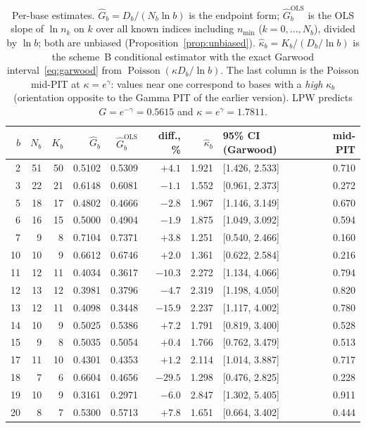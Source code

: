 \documentclass[11pt,a4paper]{article}
\theoremstyle{plain}
\theoremstyle{remark}
\newcommand{\eg}{e^{\gamma}}
\newcommand{\emg}{e^{-\gamma}}
\DeclareMathOperator{\Pois}{Poisson}
\begin{document}
\begin{table}[t]
\centering
\caption{Per-base estimates. $\hat G_b=D_b/(N_b\ln b)$ is the endpoint form;
$\hat G_b^{\mathrm{OLS}}$ is the OLS slope of $\ln n_k$ on $k$ over all known
indices including $n_{\min}$ ($k=0,\dots,N_b$), divided by $\ln b$;
both are unbiased (Proposition~\ref{prop:unbiased}).
$\hat\kappa_b=K_b/(D_b/\ln b)$ is the scheme~B conditional estimator with the
exact Garwood interval~\eqref{eq:garwood} from $\Pois(\kappa D_b/\ln b)$. The last
column is the Poisson mid-PIT at $\kappa=\eg$: values near one correspond to bases
with a \emph{high} $\kappa_b$ (orientation opposite to the Gamma PIT of the earlier
version). LPW predicts $G=\emg=0.5615$ and $\kappa=\eg=1.7811$.}
\label{tab:bases}
\small
\begin{tabular}{rrrrrrrl r}
\toprule
$b$ & $N_b$ & $K_b$ & $\hat G_b$ & $\hat G_b^{\mathrm{OLS}}$ & diff., \% &
$\hat\kappa_b$ & 95\% CI (Garwood) & mid-PIT\\
\midrule
2 & 51 & 50 & 0.5102 & 0.5309 & $+4.1$ & 1.921 & [1.426, 2.533] & 0.710\\
3 & 22 & 21 & 0.6148 & 0.6081 & $-1.1$ & 1.552 & [0.961, 2.373] & 0.272\\
5 & 18 & 17 & 0.4802 & 0.4666 & $-2.8$ & 1.967 & [1.146, 3.149] & 0.670\\
6 & 16 & 15 & 0.5000 & 0.4904 & $-1.9$ & 1.875 & [1.049, 3.092] & 0.594\\
7 & 9 & 8 & 0.7104 & 0.7371 & $+3.8$ & 1.251 & [0.540, 2.466] & 0.160\\
10 & 10 & 9 & 0.6612 & 0.6746 & $+2.0$ & 1.361 & [0.622, 2.584] & 0.216\\
11 & 12 & 11 & 0.4034 & 0.3617 & $-10.3$ & 2.272 & [1.134, 4.066] & 0.794\\
12 & 13 & 12 & 0.3981 & 0.3796 & $-4.7$ & 2.319 & [1.198, 4.050] & 0.820\\
13 & 12 & 11 & 0.4098 & 0.3448 & $-15.9$ & 2.237 & [1.117, 4.002] & 0.780\\
14 & 10 & 9 & 0.5025 & 0.5386 & $+7.2$ & 1.791 & [0.819, 3.400] & 0.528\\
15 & 9 & 8 & 0.5035 & 0.5054 & $+0.4$ & 1.766 & [0.762, 3.479] & 0.513\\
17 & 11 & 10 & 0.4301 & 0.4353 & $+1.2$ & 2.114 & [1.014, 3.887] & 0.717\\
18 & 7 & 6 & 0.6604 & 0.4656 & $-29.5$ & 1.298 & [0.476, 2.825] & 0.228\\
19 & 10 & 9 & 0.3161 & 0.2971 & $-6.0$ & 2.847 & [1.302, 5.405] & 0.911\\
20 & 8 & 7 & 0.5300 & 0.5713 & $+7.8$ & 1.651 & [0.664, 3.402] & 0.444\\
\bottomrule
\end{tabular}
\end{table}
\end{document}
